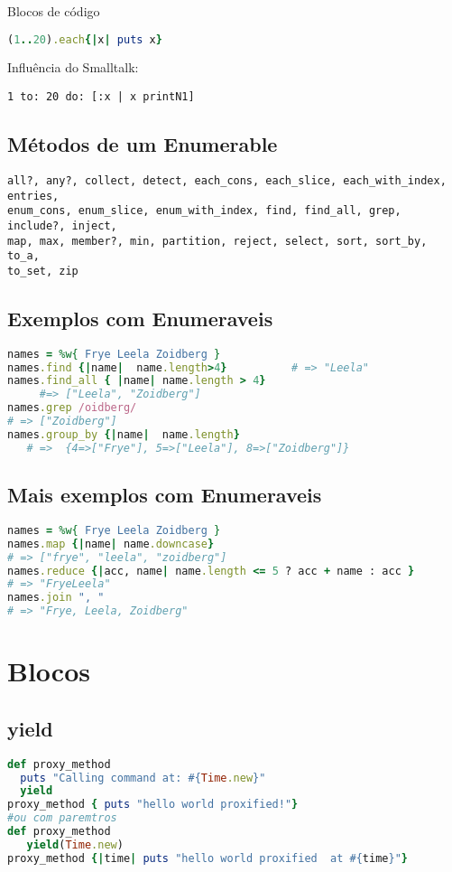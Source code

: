 \documentclass[serif,mathserif]{book}
\begin{document}
Blocos de código
\begin{lstlisting}[language=ruby]
(1..20).each{|x| puts x}
\end{lstlisting}

Influência do Smalltalk:
\begin{lstlisting}[language=smalltalk]
   1 to: 20 do: [:x | x printN1]
\end{lstlisting}

\section{ Métodos de um Enumerable}
\begin{lstlisting}  
all?, any?, collect, detect, each_cons, each_slice, each_with_index, entries,
enum_cons, enum_slice, enum_with_index, find, find_all, grep, include?, inject,
map, max, member?, min, partition, reject, select, sort, sort_by, to_a,
to_set, zip
\end{lstlisting}
 
\section{Exemplos com Enumeraveis}
\begin{lstlisting}[language=ruby]
names = %w{ Frye Leela Zoidberg }
names.find {|name|  name.length>4}          # => "Leela"
names.find_all { |name| name.length > 4}
     #=> ["Leela", "Zoidberg"]
names.grep /oidberg/
# => ["Zoidberg"]
names.group_by {|name|  name.length}
   # =>  {4=>["Frye"], 5=>["Leela"], 8=>["Zoidberg"]}
\end{lstlisting}

\section{Mais exemplos com Enumeraveis}
\begin{lstlisting}[language=ruby]
names = %w{ Frye Leela Zoidberg }
names.map {|name| name.downcase}
# => ["frye", "leela", "zoidberg"]
names.reduce {|acc, name| name.length <= 5 ? acc + name : acc }
# => "FryeLeela"
names.join ", "
# => "Frye, Leela, Zoidberg"
\end{lstlisting}


\chapter{Blocos}

\section{yield}
\begin{lstlisting}[language=ruby]
def proxy_method
  puts "Calling command at: #{Time.new}"
  yield
proxy_method { puts "hello world proxified!"}
#ou com paremtros
def proxy_method
   yield(Time.new)
proxy_method {|time| puts "hello world proxified  at #{time}"}
\end{lstlisting}
\end{document}
